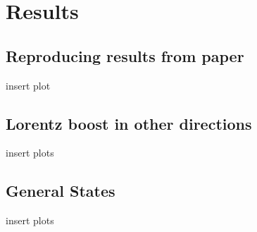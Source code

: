 \chapter{Results}

\section{Reproducing results from paper}

insert plot

\section{Lorentz boost in other directions}

insert plots

\section{General States}

insert plots